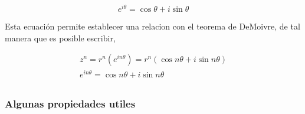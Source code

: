         \begin{equation*}
            e^{i\theta} = \cos\theta + i\sin\theta
        \end{equation*}

        Esta ecuación permite establecer una relacion con el teorema de DeMoivre, de tal manera que es posible escribir,

        \begin{gather*}
            z^{n} = r^{n}(e^{in\theta}) = r^{n}(\cos{n\theta}+ i\sin{n\theta})\\
            e^{in\theta} = \cos{n\theta}+ i\sin{n\theta}\\
        \end{gather*}


        \subsubsection{Algunas propiedades utiles}